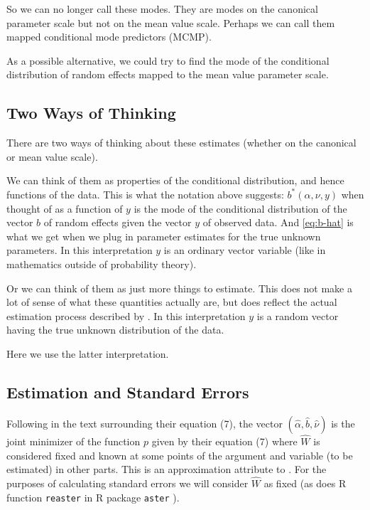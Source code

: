 \documentclass[11pt]{article}
\let\code=\texttt
\begin{document}
So we can no longer call these modes.
They are modes on the canonical parameter scale but not on the mean value
scale.
Perhaps we can call them mapped conditional mode predictors (MCMP).

As a possible alternative, we could try to find the mode of the conditional
distribution of random effects mapped to the mean value parameter scale.

\subsection{Two Ways of Thinking}

There are two ways of thinking about these estimates (whether on the
canonical or mean value scale).

We can think of them as properties
of the conditional distribution, and hence functions of the data.
This is what the notation above suggests: $b^*(\alpha, \nu, y)$ when
thought of as a function of $y$ is the mode of the conditional distribution
of the vector $b$ of random effects given the vector $y$ of observed data.
And \eqref{eq:b-hat} is what we get when we plug in parameter estimates
for the true unknown parameters.  In this interpretation $y$ is an ordinary
vector variable (like in mathematics outside of probability theory).

Or we can think of them as just more things to estimate.  This does not
make a lot of sense of what these quantities actually are, but does reflect
the actual estimation process described by \citet{reaster}.
In this interpretation $y$ is a random vector having the true unknown
distribution of the data.

Here we use the latter interpretation.

\subsection{Estimation and Standard Errors}

Following \citet{reaster} in the text surrounding their equation (7),
the vector $(\hat{\alpha}, \hat{b}, \hat{\nu})$ is the joint minimizer
of the function $p$ given by their equation (7) where $\widehat{W}$ is
considered fixed and known at some points of the argument and variable
(to be estimated) in other parts.  This is an approximation
\citet{reaster} attribute to \citet{breslow-clayton}.
For the purposes of calculating standard errors we will consider
$\widehat{W}$ as fixed (as does R function \code{reaster} in R package
\code{aster} \citep{aster-package}).
\end{document}
